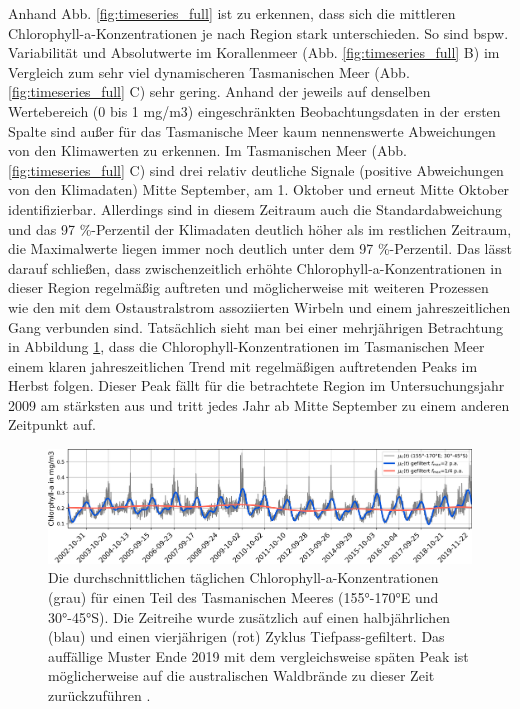 \documentclass[12pt,a4paper,onecolumn]{scrartcl}
\begin{document}
Anhand Abb. \ref{fig:timeseries_full} ist zu erkennen, dass sich die mittleren Chlorophyll-a-Konzentrationen je nach Region stark unterschieden. So sind bspw. Variabilität und Absolutwerte im Korallenmeer (Abb. \ref{fig:timeseries_full} B) im Vergleich zum sehr viel dynamischeren Tasmanischen Meer (Abb. \ref{fig:timeseries_full} C) sehr gering. Anhand der jeweils auf denselben Wertebereich (0 bis 1 mg/m3) eingeschränkten Beobachtungsdaten in der ersten Spalte sind außer für das Tasmanische Meer kaum nennenswerte Abweichungen von den Klimawerten zu erkennen. Im Tasmanischen Meer (Abb. \ref{fig:timeseries_full} C) sind drei relativ deutliche Signale (positive Abweichungen von den Klimadaten) Mitte September, am 1. Oktober und erneut Mitte Oktober identifizierbar. Allerdings sind in diesem Zeitraum auch die Standardabweichung und das 97 \%-Perzentil der Klimadaten deutlich höher als im restlichen Zeitraum, die Maximalwerte liegen immer noch deutlich unter dem 97 \%-Perzentil. Das lässt darauf schließen, dass zwischenzeitlich erhöhte Chlorophyll-a-Konzentrationen in dieser Region regelmäßig auftreten und möglicherweise mit weiteren Prozessen wie den mit dem Ostaustralstrom assoziierten Wirbeln und einem jahreszeitlichen Gang \citep{Tilburg.2002} verbunden sind. Tatsächlich sieht man bei einer mehrjährigen Betrachtung in Abbildung \ref{fig:long_timeseries_tasman}, dass die Chlorophyll-Konzentrationen im Tasmanischen Meer einem klaren jahreszeitlichen Trend mit regelmäßigen auftretenden Peaks im Herbst folgen. Dieser Peak fällt für die betrachtete Region im Untersuchungsjahr 2009 am stärksten aus und tritt jedes Jahr ab Mitte September zu einem anderen Zeitpunkt auf.
\begin{figure}[!htb]
\includegraphics[width=\textwidth]{bilder/long_timeseries_tasman.png}
\caption{Die durchschnittlichen täglichen Chlorophyll-a-Konzentrationen (grau) für einen Teil des Tasmanischen Meeres (155°-170°E und 30°-45°S). Die Zeitreihe wurde zusätzlich auf einen halbjährlichen (blau) und einen vierjährigen (rot) Zyklus Tiefpass-gefiltert. Das auffällige Muster Ende 2019 mit dem vergleichsweise späten Peak ist möglicherweise auf die australischen Waldbrände zu dieser Zeit zurückzuführen \citep{Li.2021}.} \label{fig:long_timeseries_tasman}
\end{figure}
\end{document}
